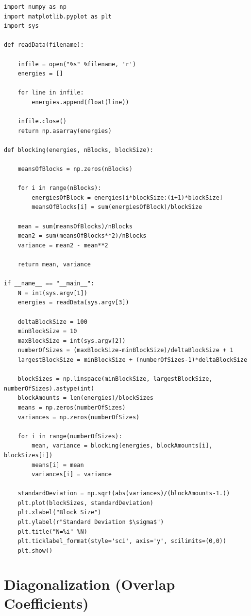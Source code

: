 \documentclass[../main.tex]{subfiles}
\begin{document}
\lstset{language=Python}
\begin{lstlisting}[title={Blocking in Python}]
import numpy as np
import matplotlib.pyplot as plt
import sys

def readData(filename):
    
    infile = open("%s" %filename, 'r')
    energies = []
    
    for line in infile:
        energies.append(float(line))
    
    infile.close()
    return np.asarray(energies)
    
def blocking(energies, nBlocks, blockSize):
    
    meansOfBlocks = np.zeros(nBlocks)
    
    for i in range(nBlocks):
        energiesOfBlock = energies[i*blockSize:(i+1)*blockSize]
        meansOfBlocks[i] = sum(energiesOfBlock)/blockSize
    
    mean = sum(meansOfBlocks)/nBlocks
    mean2 = sum(meansOfBlocks**2)/nBlocks
    variance = mean2 - mean**2
    
    return mean, variance
    
if __name__ == "__main__":
    N = int(sys.argv[1])
    energies = readData(sys.argv[3])
    
    deltaBlockSize = 100
    minBlockSize = 10
    maxBlockSize = int(sys.argv[2])
    numberOfSizes = (maxBlockSize-minBlockSize)/deltaBlockSize + 1
    largestBlockSize = minBlockSize + (numberOfSizes-1)*deltaBlockSize
    
    blockSizes = np.linspace(minBlockSize, largestBlockSize, numberOfSizes).astype(int)
    blockAmounts = len(energies)/blockSizes
    means = np.zeros(numberOfSizes)
    variances = np.zeros(numberOfSizes)
    
    for i in range(numberOfSizes):
        mean, variance = blocking(energies, blockAmounts[i], blockSizes[i])
        means[i] = mean
        variances[i] = variance
    
    standardDeviation = np.sqrt(abs(variances)/(blockAmounts-1.))
    plt.plot(blockSizes, standardDeviation)
    plt.xlabel("Block Size")
    plt.ylabel(r"Standard Deviation $\sigma$")
    plt.title("N=%i" %N)
    plt.ticklabel_format(style='sci', axis='y', scilimits=(0,0))
    plt.show()
\end{lstlisting}

\section{Diagonalization (Overlap Coefficients)}
\end{document}
